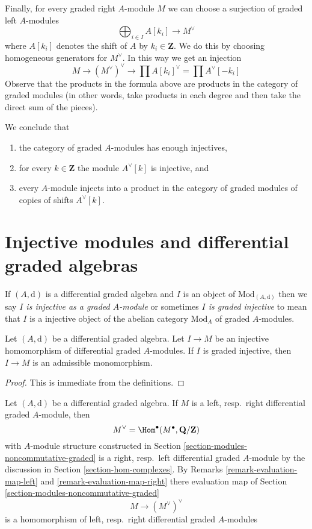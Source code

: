 \medskip\noindent
Finally, for every graded right $A$-module $M$ we can choose a surjection
of graded left $A$-modules
$$
\bigoplus\nolimits_{i \in I} A[k_i] \to M^\vee
$$
where $A[k_i]$ denotes the shift of $A$ by $k_i \in \mathbf{Z}$.
We do this by choosing homogeneous generators for $M^\vee$.
In this way we get an injection
$$
M \to (M^\vee)^\vee \to \prod A[k_i]^\vee = \prod A^\vee[-k_i]
$$
Observe that the products in the formula above are products in the
category of graded modules (in other words, take products in each degree
and then take the direct sum of the pieces).

\medskip\noindent
We conclude that
\begin{enumerate}
\item the category of graded $A$-modules has enough injectives,
\item for every $k \in \mathbf{Z}$ the module $A^\vee[k]$ is injective, and
\item every $A$-module injects into a product in the category of graded
modules of copies of shifts $A^\vee[k]$.
\end{enumerate}





\section{Injective modules and differential graded algebras}
\label{section-modules-noncommutative-differential-graded}

\noindent
If $(A, \text{d})$ is a differential graded algebra and $I$ is
an object of $\text{Mod}_{(A, \text{d})}$ then we say
{\it $I$ is injective as a graded $A$-module} or sometimes
{\it $I$ is graded injective} to mean
that $I$ is a injective object of the abelian category $\text{Mod}_A$
of graded $A$-modules.

\begin{lemma}
\label{lemma-source-graded-injective}
Let $(A, \text{d})$ be a differential graded algebra.
Let $I \to M$ be an injective homomorphism of differential graded
$A$-modules. If $I$ is graded injective, then
$I \to M$ is an admissible monomorphism.
\end{lemma}

\begin{proof}
This is immediate from the definitions.
\end{proof}

\noindent
Let $(A, \text{d})$ be a differential graded algebra. If $M$ is a
left, resp.\ right differential graded $A$-module, then
$$
M^\vee = \Hom^\bullet(M^\bullet, \mathbf{Q}/\mathbf{Z})
$$
with $A$-module structure constructed in
Section \ref{section-modules-noncommutative-graded} is a
right, resp.\ left differential graded $A$-module by the
discussion in Section \ref{section-hom-complexes}.
By Remarks
\ref{remark-evaluation-map-left} and \ref{remark-evaluation-map-right}
there evaluation map of Section \ref{section-modules-noncommutative-graded}
$$
M \longrightarrow (M^\vee)^\vee
$$
is a homomorphism of left, resp.\ right differential graded $A$-modules

